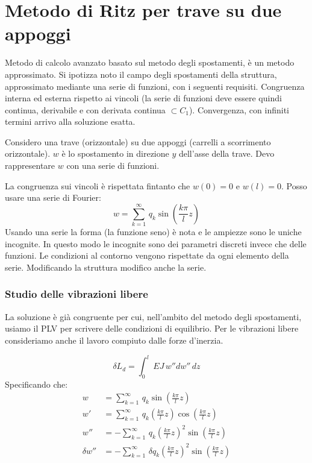 \section{Metodo di Ritz per trave su due appoggi}

Metodo di calcolo avanzato basato sul metodo degli spostamenti, è un metodo approssimato.
Si ipotizza noto il campo degli spostamenti della struttura, approssimato mediante una serie di funzioni, con i seguenti requisiti. Congruenza interna ed esterna rispetto ai vincoli (la serie di funzioni deve essere quindi continua, derivabile e con derivata continua $\subset C_1$). Convergenza, con infiniti termini arrivo alla soluzione esatta.

Considero una trave (orizzontale) su due appoggi (carrelli a scorrimento orizzontale). $w$ è lo spostamento in direzione $y$ dell'asse della trave. Devo rappresentare  $w$ con una serie di funzioni.

La congruenza sui vincoli è rispettata fintanto che $w(0)=0$ e $w(l)=0$. Posso usare una serie di Fourier:
\begin{equation*}
    w= \sum^\infty_{k=1}\,q_k\sin{\left(\frac{k\pi}{l}z\right)}
\end{equation*}
Usando una serie la forma (la funzione seno) è nota e le ampiezze sono le uniche incognite. In questo modo le incognite sono dei parametri discreti invece che delle funzioni. Le condizioni al contorno vengono rispettate da ogni elemento della serie. Modificando la struttura modifico anche la serie.

\subsubsection*{Studio delle vibrazioni libere}
La soluzione è già congruente per cui, nell'ambito del metodo degli spostamenti, usiamo il PLV per scrivere delle condizioni di equilibrio. Per le vibrazioni libere consideriamo anche il lavoro compiuto dalle forze d'inerzia.

\begin{equation*}
    \delta L_d=\int_0^l \,EJ \,w''dw''\,dz
\end{equation*}
Specificando che:
\begin{align*}
    w&= \sum^\infty_{k=1}\,q_k\sin{\left(\frac{k\pi}{l}z\right)}\\
      w'&= \sum^\infty_{k=1}\,q_k   \left(\frac{k\pi}{l}z\right)  \cos{\left(\frac{k\pi}{l}z\right)}\\
       w''&=- \sum^\infty_{k=1}\,q_k   \left(\frac{k\pi}{l}z\right)^2  \sin{\left(\frac{k\pi}{l}z\right)}\\
        \delta w''&=- \sum^\infty_{k=1}\,\delta q_k   \left(\frac{k\pi}{l}z\right)^2  \sin{\left(\frac{k\pi}{l}z\right)}
\end{align*}

